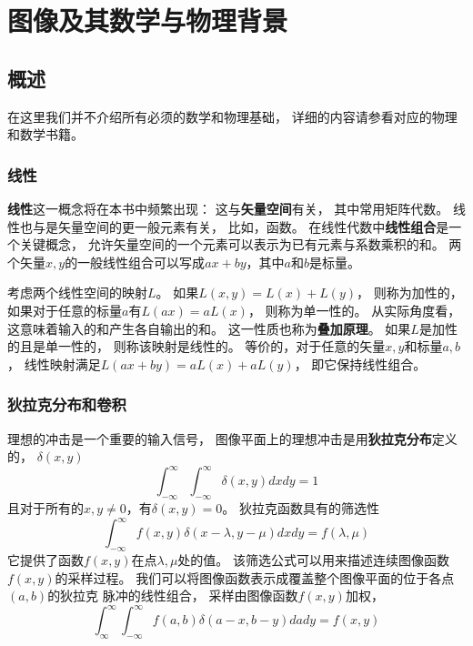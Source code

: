 \chapter{图像及其数学与物理背景}
\section{概述}
在这里我们并不介绍所有必须的数学和物理基础，%
详细的内容请参看对应的物理和数学书籍。

\subsection{线性}
\textbf{\color{magenta}线性}这一概念将在本书中频繁出现：%
这与\textbf{\color{magenta}矢量空间}有关，%
其中常用矩阵代数。%
线性也与是矢量空间的更一般元素有关，%
比如，函数。%
在线性代数中\textbf{\color{magenta}线性组合}是一个关键概念，%
允许矢量空间的一个元素可以表示为已有元素与系数乘积的和。%
两个矢量$x,y$的一般线性组合可以写成$ax+by$，其中$a$和$b$是标量。%

考虑两个线性空间的映射$L$。%
如果$L(x,y)=L(x)+L(y)$，%
则称为加性的，%
如果对于任意的标量$a$有$L(ax)=aL(x)$，%
则称为单一性的。%
从实际角度看，这意味着输入的和产生各自输出的和。%
这一性质也称为\textbf{\color{magenta}叠加原理}。%
如果$L$是加性的且是单一性的，%
则称该映射是线性的。%
等价的，对于任意的矢量$x,y$和标量$a,b$，%
线性映射满足$L(ax+by)=aL(x)+aL(y)$，%
即它保持线性组合。

\subsection{狄拉克分布和卷积}
理想的冲击是一个重要的输入信号，%
图像平面上的理想冲击是用\textbf{\color{magenta}狄拉克分布}定义的，%
$\delta(x,y)$
\begin{equation}
  \int_{-\infty}^{\infty}\int_{-\infty}^{\infty}\delta(x,y)dxdy = 1
\end{equation}
且对于所有的$x,y\neq0$，有$\delta(x,y)=0$。%
狄拉克函数具有的筛选性
\begin{equation}
  \int_{-\infty}^{\infty}f(x,y)\delta(x-\lambda,y-\mu)dxdy = f(\lambda,\mu)
\end{equation}
它提供了函数$f(x,y)$在点$\lambda,\mu$处的值。%
该筛选公式可以用来描述连续图像函数$f(x,y)$的采样过程。%
我们可以将图像函数表示成覆盖整个图像平面的位于各点$(a,b)$的狄拉克
脉冲的线性组合，%
采样由图像函数$f(x,y)$加权，%
\begin{equation}
  \int_{\infty}^{\infty}\int_{-\infty}^{\infty}f(a,b)\delta(a-x,b-y)dady = f(x,y)
\end{equation}

